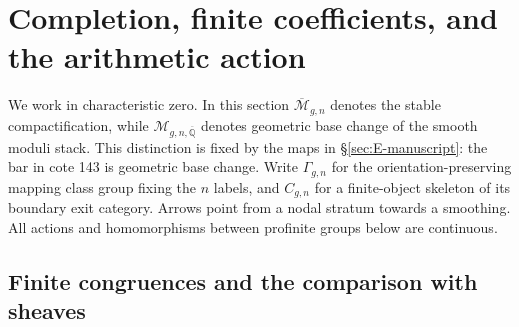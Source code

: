 \section{Completion, finite coefficients, and the arithmetic action}
\label{sec:E}

We work in characteristic zero.  In this section $\overline{\mathcal M}_{g,n}$
denotes the stable compactification, while
$\mathcal M_{g,n,\overline{\mathbb Q}}$ denotes geometric base change of
the smooth moduli stack.  This distinction is fixed by the maps in
\S\ref{sec:E-manuscript}: the bar in cote 143 is geometric base change.
Write $\Gamma_{g,n}$ for the orientation-preserving mapping class group
fixing the $n$ labels, and $C_{g,n}$ for a finite-object skeleton of its
boundary exit category.  Arrows point from a nodal stratum towards a
smoothing.  All actions and homomorphisms between profinite groups below
are continuous.

\subsection{Finite congruences and the comparison with sheaves}

